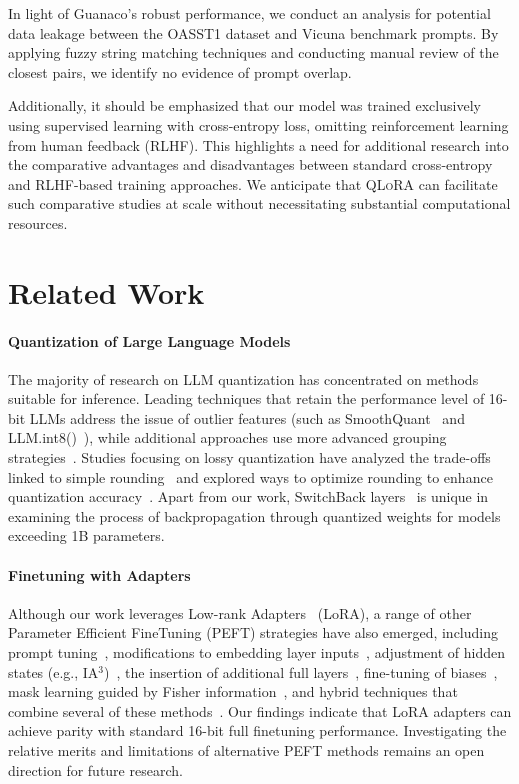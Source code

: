 In light of {Guanaco}’s robust performance, we conduct an analysis for potential data leakage between the OASST1 dataset and Vicuna benchmark prompts. By applying fuzzy string matching techniques and conducting manual review of the closest pairs, we identify no evidence of prompt overlap.

Additionally, it should be emphasized that our model was trained exclusively using supervised learning with cross-entropy loss, omitting reinforcement learning from human feedback (RLHF). This highlights a need for additional research into the comparative advantages and disadvantages between standard cross-entropy and RLHF-based training approaches. We anticipate that \textsc{QLoRA} can facilitate such comparative studies at scale without necessitating substantial computational resources.

\section{Related Work}

\paragraph{Quantization of Large Language Models} The majority of research on LLM quantization has concentrated on methods suitable for inference. Leading techniques that retain the performance level of 16-bit LLMs address the issue of outlier features (such as SmoothQuant~\citep{xiao2022smoothquant} and LLM.int8()~\citep{dettmers2022llm}), while additional approaches use more advanced grouping strategies~\citep{park2022nuqmm, yao2022zeroquant}. Studies focusing on lossy quantization have analyzed the trade-offs linked to simple rounding~\citep{dettmers2022case,zeng2022glm,pope2022efficiently} and explored ways to optimize rounding to enhance quantization accuracy~\citep{frantar2022gptq}. Apart from our work, SwitchBack layers~\citep{wortsman2023stable} is unique in examining the process of backpropagation through quantized weights for models exceeding 1B parameters.

\paragraph{Finetuning with Adapters} Although our work leverages Low-rank Adapters~\citep{hu2021lora} (LoRA), a range of other Parameter Efficient FineTuning (PEFT) strategies have also emerged, including prompt tuning~\citep{qin2021learning,lester2021power,li2021prefix}, modifications to embedding layer inputs~\citep{an2022input}, adjustment of hidden states (e.g., IA$^3$)~\citep{liu2022few}, the insertion of additional full layers~\citep{houlsby2019parameter}, fine-tuning of biases~\citep{zaken2021bitfit}, mask learning guided by Fisher information~\citep{sung2021training}, and hybrid techniques that combine several of these methods~\citep{henderson2021compacter}. Our findings indicate that LoRA adapters can achieve parity with standard 16-bit full finetuning performance. Investigating the relative merits and limitations of alternative PEFT methods remains an open direction for future research.

